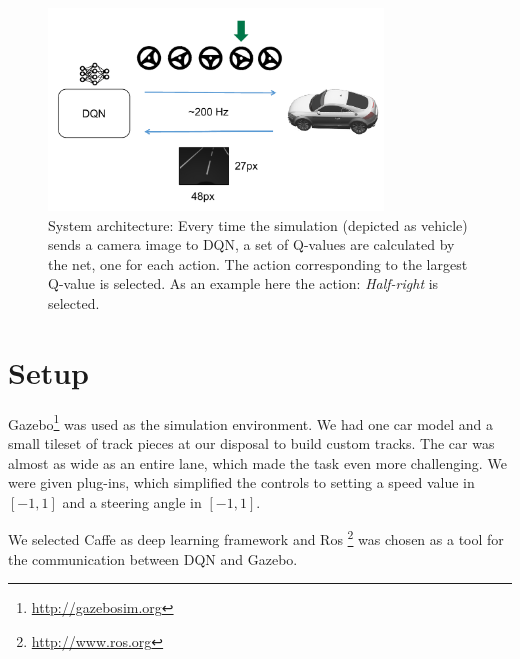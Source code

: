 
\begin{figure}[!t]
	\centering
	\includegraphics[width=3.5in]{../presentation/archi} 
	\caption{System architecture: Every time the simulation (depicted as vehicle) sends a camera image to DQN, a set of Q-values are calculated by the net, one for each action. The action corresponding to the largest Q-value is selected. As an example here the action: \textit{Half-right} is selected.}
	\label{fig:archi}
\end{figure}

\section{Setup} \label{sec:setup}
Gazebo\footnote{\url{http://gazebosim.org}} was used as the simulation environment. We had one car model and a small tileset of track pieces at our disposal to build custom tracks. The car was almost as wide as an entire lane, which made the task even more challenging. We were given plug-ins, which simplified the controls to setting a speed value in $[-1, 1]$ and a steering angle in $[-1, 1]$.

We selected Caffe\cite{jia2014caffe} as deep learning framework and Ros \footnote{\url{http://www.ros.org}} was chosen as a tool for the communication between DQN and Gazebo.